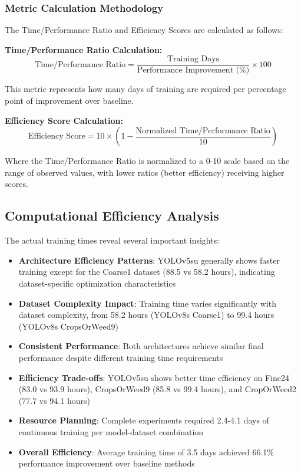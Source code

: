
\subsubsection{Metric Calculation Methodology}

The Time/Performance Ratio and Efficiency Scores are calculated as follows:

\textbf{Time/Performance Ratio Calculation:}
\begin{equation}
\text{Time/Performance Ratio} = \frac{\text{Training Days}}{\text{Performance Improvement (\%)}} \times 100
\end{equation}

This metric represents how many days of training are required per percentage point of improvement over baseline.

\textbf{Efficiency Score Calculation:}
\begin{equation}
\text{Efficiency Score} = 10 \times \left(1 - \frac{\text{Normalized Time/Performance Ratio}}{10}\right)
\end{equation}

Where the Time/Performance Ratio is normalized to a 0-10 scale based on the range of observed values, with lower ratios (better efficiency) receiving higher scores.

\subsection{Computational Efficiency Analysis}

The actual training times reveal several important insights:

\begin{itemize}
    \item \textbf{Architecture Efficiency Patterns}: YOLOv5su generally shows faster training except for the Coarse1 dataset (88.5 vs 58.2 hours), indicating dataset-specific optimization characteristics
    \item \textbf{Dataset Complexity Impact}: Training time varies significantly with dataset complexity, from 58.2 hours (YOLOv8s Coarse1) to 99.4 hours (YOLOv8s CropsOrWeed9)
    \item \textbf{Consistent Performance}: Both architectures achieve similar final performance despite different training time requirements
    \item \textbf{Efficiency Trade-offs}: YOLOv5su shows better time efficiency on Fine24 (83.0 vs 93.9 hours), CropsOrWeed9 (85.8 vs 99.4 hours), and CropOrWeed2 (77.7 vs 94.1 hours)
    \item \textbf{Resource Planning}: Complete experiments required 2.4-4.1 days of continuous training per model-dataset combination
    \item \textbf{Overall Efficiency}: Average training time of 3.5 days achieved 66.1\% performance improvement over baseline methods
\end{itemize}

